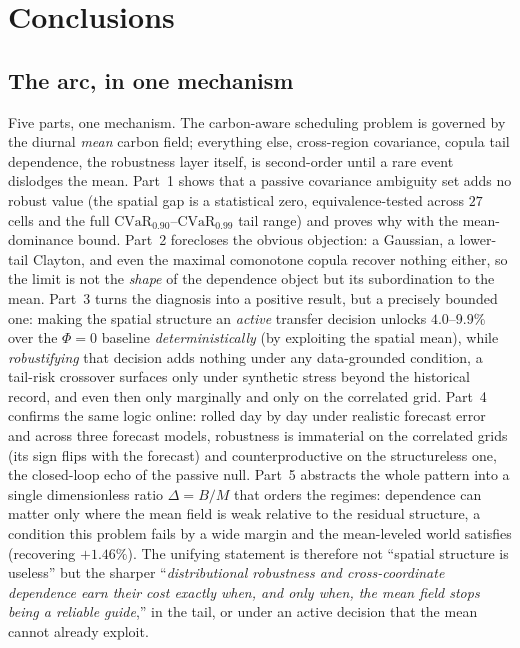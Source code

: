 \documentclass[12pt]{article}
\newcommand{\CVaR}{\mathrm{CVaR}}
\begin{document}
\section{Conclusions}\label{sec:conclusion}

\subsection{The arc, in one mechanism}
Five parts, one mechanism. The carbon-aware scheduling problem is governed by the
diurnal \emph{mean} carbon field; everything else, cross-region covariance, copula
tail dependence, the robustness layer itself, is second-order until a rare event
dislodges the mean. Part~1 shows that a passive covariance ambiguity set adds no
robust value (the spatial gap is a statistical zero, equivalence-tested across $27$
cells and the full $\CVaR_{0.90}$--$\CVaR_{0.99}$ tail range) and proves why with the
mean-dominance bound. Part~2 forecloses the obvious objection: a Gaussian, a lower-tail
Clayton, and even the maximal comonotone copula recover nothing either, so the limit is
not the \emph{shape} of the dependence object but its subordination to the mean. Part~3
turns the diagnosis into a positive result, but a precisely bounded one: making the
spatial structure an \emph{active} transfer decision unlocks $4.0$--$9.9\%$ over the
$\Phi=0$ baseline \emph{deterministically} (by exploiting the spatial mean), while \emph{robustifying}
that decision adds nothing under any data-grounded condition, a tail-risk crossover
surfaces only under synthetic stress beyond the historical record, and even then only
marginally and only on the correlated grid. Part~4 confirms the same logic online:
rolled day by day under realistic forecast error and across three forecast models,
robustness is immaterial on the correlated grids (its sign flips with the forecast) and
counterproductive on the structureless one, the closed-loop echo of the passive null. Part~5 abstracts the whole pattern into a single
dimensionless ratio $\Delta=B/M$ that orders the regimes: dependence can matter only
where the mean field is weak relative to the residual structure, a condition this
problem fails by a wide margin and the mean-leveled world satisfies (recovering
$+1.46\%$). The unifying statement is therefore not ``spatial structure is useless''
but the sharper ``\emph{distributional robustness and cross-coordinate dependence earn
their cost exactly when, and only when, the mean field stops being a reliable guide},''
in the tail, or under an active decision that the mean cannot already exploit.
\end{document}

